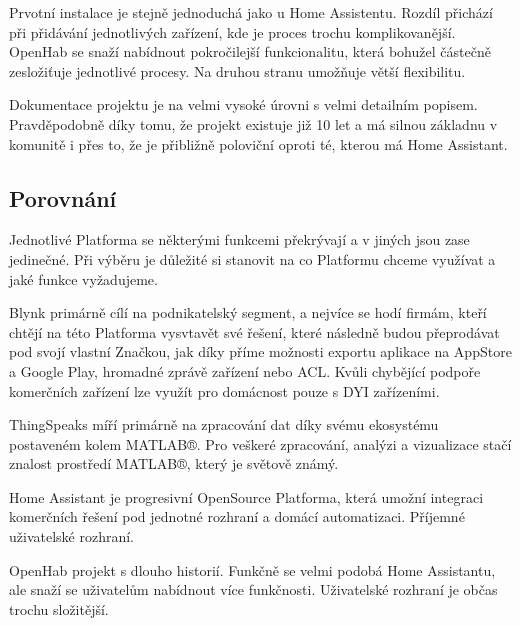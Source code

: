 \documentclass[thesis=B,czech]{FITthesis}[2019/12/23]
\begin{document}
Prvotní instalace je stejně jednoduchá jako u Home Assistentu. Rozdíl přichází při přidávání jednotlivých zařízení, kde je proces trochu komplikovanější. OpenHab se snaží nabídnout pokročilejší funkcionalitu, která bohužel částečně zesložiťuje jednotlivé procesy. Na druhou stranu umožňuje větší flexibilitu.
 
Dokumentace projektu je na velmi vysoké úrovni s velmi detailním popisem. Pravděpodobně díky tomu, že projekt existuje již 10 let a má silnou základnu v komunitě i přes to, že je přibližně poloviční oproti té, kterou má Home Assistant. 
 
\subsection{Porovnání}
Jednotlivé Platforma se některými funkcemi překrývají a v jiných jsou zase jedinečné. Při výběru je důležité si stanovit na co Platformu chceme využívat a jaké funkce vyžadujeme. 

Blynk primárně cílí na podnikatelský segment, a nejvíce se hodí firmám, kteří chtějí na této Platforma vysvtavět své řešení, které následně budou přeprodávat pod svojí vlastní Značkou, jak díky příme možnosti exportu aplikace na AppStore a Google Play, hromadné zprávě zařízení nebo ACL. Kvůli chybějící podpoře komerčních zařízení lze využít pro domácnost pouze s DYI zařízeními.

ThingSpeaks míří primárně na zpracování dat díky svému ekosystému postaveném kolem MATLAB®. Pro veškeré zpracování, analýzi a vizualizace stačí znalost prostředí MATLAB®, který je světově známý.

Home Assistant je progresivní OpenSource Platforma, která umožní integraci komerčních řešení pod jednotné rozhraní a domácí automatizaci. Příjemné uživatelské rozhraní.

OpenHab projekt s dlouho historií. Funkčně se velmi podobá Home Assistantu, ale snaží se uživatelům nabídnout více funkčnosti. Uživatelské rozhraní je občas trochu složitější.
\end{document}

